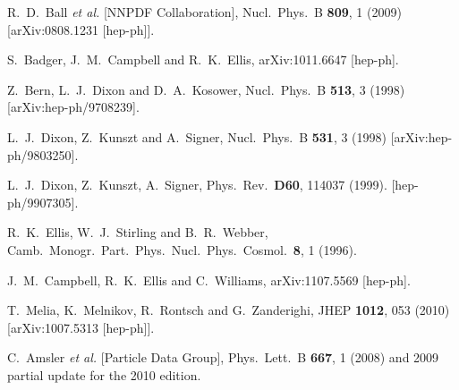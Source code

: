 \documentclass[12pt]{article}
\begin{document}
\begin{thebibliography}{99}
  R.~D.~Ball {\it et al.}  [NNPDF Collaboration],
  Nucl.\ Phys.\  B {\bf 809}, 1 (2009)
  [arXiv:0808.1231 [hep-ph]].

  S.~Badger, J.~M.~Campbell and R.~K.~Ellis,
  arXiv:1011.6647 [hep-ph].

  Z.~Bern, L.~J.~Dixon and D.~A.~Kosower,
  Nucl.\ Phys.\  B {\bf 513}, 3 (1998)
  [arXiv:hep-ph/9708239].

  L.~J.~Dixon, Z.~Kunszt and A.~Signer,
  Nucl.\ Phys.\  B {\bf 531}, 3 (1998)
  [arXiv:hep-ph/9803250].

  L.~J.~Dixon, Z.~Kunszt, A.~Signer,
  Phys.\ Rev.\  {\bf D60}, 114037 (1999).
  [hep-ph/9907305].

  R.~K.~Ellis, W.~J.~Stirling and B.~R.~Webber,
  Camb.\ Monogr.\ Part.\ Phys.\ Nucl.\ Phys.\ Cosmol.\  {\bf 8}, 1 (1996).

  J.~M.~Campbell, R.~K.~Ellis and C.~Williams,
  arXiv:1107.5569 [hep-ph].

  T.~Melia, K.~Melnikov, R.~Rontsch and G.~Zanderighi,
  JHEP {\bf 1012}, 053 (2010)
  [arXiv:1007.5313 [hep-ph]].

  C.~Amsler {\it et al.}  [Particle Data Group],
  Phys.\ Lett.\  B {\bf 667}, 1 (2008)
 and 2009 partial update for the 2010 edition.


\end{thebibliography}
\end{document}
